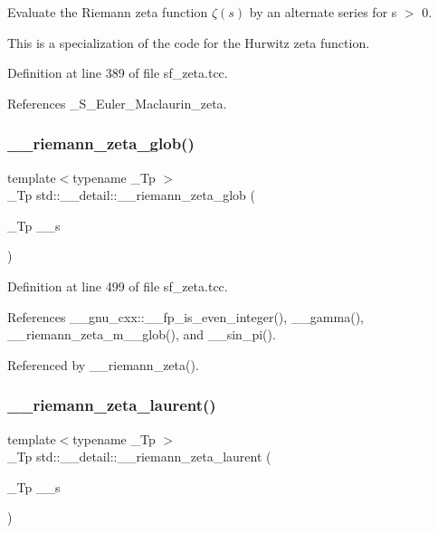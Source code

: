 Evaluate the Riemann zeta function $ \zeta(s) $ by an alternate series for s $>$ 0. 

This is a specialization of the code for the Hurwitz zeta function. 

Definition at line 389 of file sf\+\_\+zeta.\+tcc.



References \+\_\+\+S\+\_\+\+Euler\+\_\+\+Maclaurin\+\_\+zeta.

\mbox{\label{namespacestd_1_1____detail_ab3542ea44b34da3d4865ed9a014e2951}} 
\subsubsection{\texorpdfstring{\+\_\+\+\_\+riemann\+\_\+zeta\+\_\+glob()}{\_\_riemann\_zeta\_glob()}}
{\footnotesize\ttfamily template$<$typename \+\_\+\+Tp $>$ \\
\+\_\+\+Tp std\+::\+\_\+\+\_\+detail\+::\+\_\+\+\_\+riemann\+\_\+zeta\+\_\+glob (\begin{DoxyParamCaption}\item[{\+\_\+\+Tp}]{\+\_\+\+\_\+s }\end{DoxyParamCaption})}



Definition at line 499 of file sf\+\_\+zeta.\+tcc.



References \+\_\+\+\_\+gnu\+\_\+cxx\+::\+\_\+\+\_\+fp\+\_\+is\+\_\+even\+\_\+integer(), \+\_\+\+\_\+gamma(), \+\_\+\+\_\+riemann\+\_\+zeta\+\_\+m\+\_\+\_\+glob(), and \+\_\+\+\_\+sin\+\_\+pi().



Referenced by \+\_\+\+\_\+riemann\+\_\+zeta().

\mbox{\label{namespacestd_1_1____detail_a5aa95e3482a58e4bd0a7f8395f88fe1c}} 
\subsubsection{\texorpdfstring{\+\_\+\+\_\+riemann\+\_\+zeta\+\_\+laurent()}{\_\_riemann\_zeta\_laurent()}}
{\footnotesize\ttfamily template$<$typename \+\_\+\+Tp $>$ \\
\+\_\+\+Tp std\+::\+\_\+\+\_\+detail\+::\+\_\+\+\_\+riemann\+\_\+zeta\+\_\+laurent (\begin{DoxyParamCaption}\item[{\+\_\+\+Tp}]{\+\_\+\+\_\+s }\end{DoxyParamCaption})}



